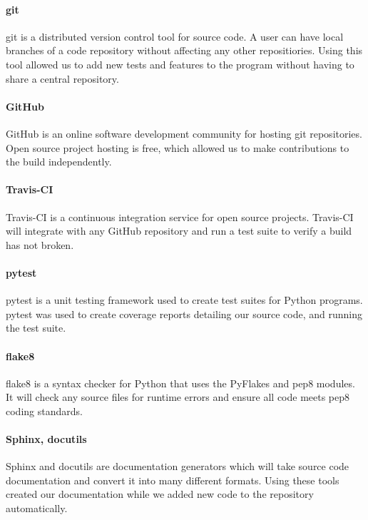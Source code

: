 \documentclass{bioinfo}
\begin{document}
\paragraph{git\textcolon} 
git is a distributed version control tool for source code. A user can have local branches of a code repository without affecting any other repositiories. Using this tool allowed us to add new tests and features to the program without having to share a central repository.

\paragraph{GitHub\textcolon} 
GitHub is an online software development community for hosting git repositories. Open source project hosting is free, which allowed us to make contributions to the build independently.
    
\paragraph{Travis-CI\textcolon}
Travis-CI is a continuous integration service for open source projects. Travis-CI will integrate with any GitHub repository and run a test suite to verify a build has not broken.

\paragraph{pytest\textcolon} 
pytest is a unit testing framework used to create test suites for Python programs. pytest was used to create coverage reports detailing our source code, and running the test suite.

\paragraph{flake8\textcolon} 
flake8 is a syntax checker for Python that uses the PyFlakes and pep8 modules. It will check any source files for runtime errors and ensure all code meets pep8 coding standards.
    
\paragraph{Sphinx, docutils\textcolon}
Sphinx and docutils are documentation generators which will take source code documentation and convert it into many different formats. Using these tools created our documentation while we added new code to the repository automatically.
\end{document}
